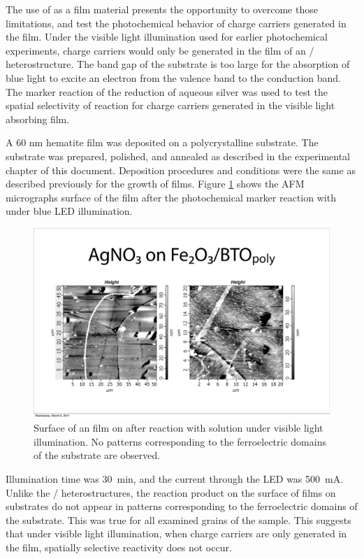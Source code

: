 The use of  as a film material presents the opportunity to overcome those limitations, and test the photochemical behavior of charge carriers generated in the film. Under the visible light illumination used for earlier photochemical experiments, charge carriers would only be generated in the film of an / heterostructure. The band gap of the substrate is too large for the absorption of blue light to excite an electron from the valence band to the conduction band. The marker reaction of the reduction of aqueous silver was used to test the spatial selectivity of reaction for charge carriers generated in the visible light absorbing film.

A 60 nm hematite film was deposited on a polycrystalline  substrate. The substrate was prepared, polished, and annealed as described in the experimental chapter of this document. Deposition procedures and conditions were the same as described previously for the growth of  films. Figure \ref{fig:btoblue} shows the AFM micrographs surface of the film after the photochemical marker reaction with  under blue LED illumination. 
\begin{figure}[htbp]
\begin{center}
\includegraphics[width=\textwidth]{btoblue.pdf}
\caption[Surface of an  film on  after reaction]{Surface of an  film on  after reaction with  solution under visible light illumination. No patterns corresponding to the ferroelectric domains of the substrate are observed.}
\label{fig:btoblue} %
\end{center}
\end{figure}
Illumination time was \SI{30}{\minute}, and the current through the LED was \SI{500}{\milli\ampere}. Unlike the / heterostructures, the reaction product on the surface of  films on  substrates do not appear in patterns corresponding to the ferroelectric domains of the substrate. This was true for all examined grains of the sample. This suggests that under visible light illumination, when charge carriers are only generated in the film, spatially selective reactivity does not occur.


